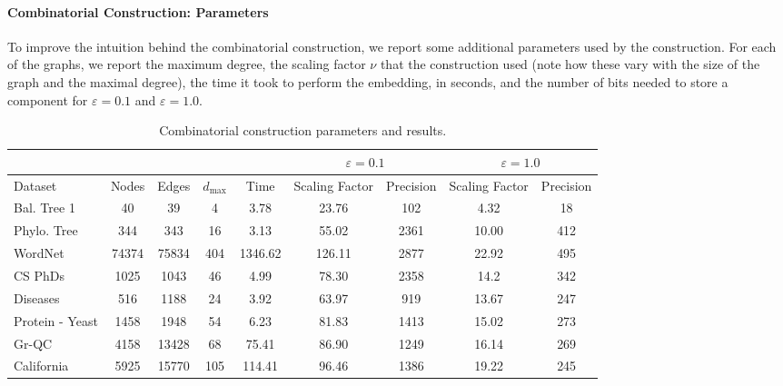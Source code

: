 \paragraph*{Combinatorial Construction: Parameters}
To improve the intuition behind the combinatorial construction, we report some additional parameters used by the construction. For each of the graphs, we report the maximum degree, the scaling factor $\nu$ that the construction used (note how these vary with the size of the graph and the maximal degree), the time it took to perform the embedding, in seconds, and the number of bits needed to store a component for $\varepsilon=0.1$ and $\varepsilon=1.0$.

\begin{table*}[h]
\centering
\begin{tabular}{|l|c|c||c|c|c|c|c|c|} \hline
                              &               &                  &                            &   &              \multicolumn{2}{c|}{$\varepsilon=0.1$} &   \multicolumn{2}{c|}{$\varepsilon=1.0$} \\ \hline
Dataset     	          &  Nodes & Edges   &   $d_{\max}$ & Time    & Scaling Factor &  Precision      & Scaling Factor &  Precision \\ \hline\hline
Bal. Tree 1          & 40  	      &  39          & 4             &  3.78      & 23.76                & 102   & 4.32 & 18 \\ \hline
Phylo. Tree          & 344      & 343        & 16           & 3.13       & 55.02               & 2361  &  10.00   &  412   \\ \hline \hline
WordNet              & 74374 &  75834  &  404       & 1346.62 & 126.11           & 2877  & 22.92 & 495\\ \hline
CS PhDs              & 1025     &  1043    &  46          &  4.99       & 78.30               & 2358  & 14.2 & 342 \\ \hline \hline
Diseases              & 516      & 1188     & 24          &    3.92       & 63.97             & 919 & 13.67 & 247  \\ \hline
Protein - Yeast   & 1458   & 1948     & 54           &  6.23       &  81.83             & 1413  & 15.02 & 273 \\ \hline \hline
Gr-QC                   & 4158    &  13428  & 68          & 75.41      & 86.90             &  1249 &  16.14 & 269 \\ \hline
California           & 5925     &   15770 &  105      & 114.41   & 96.46               & 1386  & 19.22 & 245\\ \hline
\end{tabular}
\caption{Combinatorial construction parameters and results.}
\label{table:comb_setup}
\end{table*}

